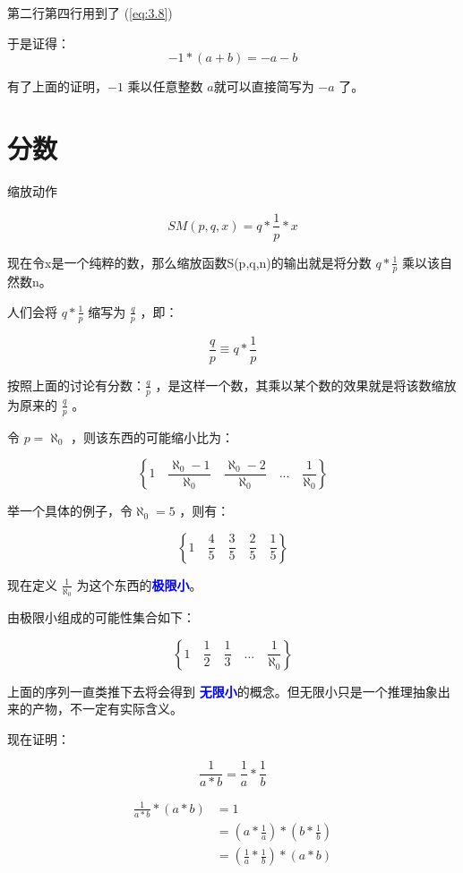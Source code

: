 \documentclass[12pt,oneside]{book}
\renewcommand{\emph}[1]{\textcolor{blue}{\textbf{#1}}}
\begin{document}
第二行第四行用到了 (\ref{eq:3.8})

于是证得：
\begin{equation}
\label{eq:4.10}
-1 * (a+b) = -a -b
\end{equation}

有了上面的证明，$-1$ 乘以任意整数 $a$就可以直接简写为 $-a$ 了。




\section{分数}
缩放动作

\begin{equation}
SM(p,q,x) = q* \frac{1}{p} *x
\end{equation}

现在令x是一个纯粹的数，那么缩放函数S(p,q,n)的输出就是将分数 $q* \frac{1}{p}$ 乘以该自然数n。

人们会将 $q* \frac{1}{p}$ 缩写为 $\frac{q}{p}$ ，即：

\begin{equation}
\frac{q}{p} \equiv q* \frac{1}{p}
\end{equation}

按照上面的讨论有分数：$\frac{q}{p}$ ，是这样一个数，其乘以某个数的效果就是将该数缩放为原来的 $\frac{q}{p}$ 。


令 $p=\aleph_0$ ，则该东西的可能缩小比为：

\[
\left\{1 \quad \frac{\aleph_0-1}{\aleph_0} \quad \frac{\aleph_0-2}{\aleph_0} \quad  ...  \quad \frac{1}{\aleph_0} \right\}
\]

举一个具体的例子，令$\aleph_0 = 5$ ，则有：

\[
\left\{1 \quad \frac{4}{5} \quad \frac{3}{5} \quad  \frac{2}{5}  \quad \frac{1}{5} \right\}
\]

现在定义 $\frac{1}{\aleph_0}$ 为这个东西的\emph{极限小}。

由极限小组成的可能性集合如下：

\[
\left\{1 \quad \frac{1}{2} \quad \frac{1}{3} \quad  ...  \quad \frac{1}{\aleph_0} \right\}
\]


上面的序列一直类推下去将会得到 \emph{无限小}的概念。但无限小只是一个推理抽象出来的产物，不一定有实际含义。

现在证明：

\begin{equation}
\label{eq:17}
\frac{1}{a*b} = \frac{1}{a} * \frac{1}{b}
\end{equation}

\begin{align*}
\frac{1}{a*b} * (a*b) &=1\\
&= (a*\frac{1}{a}) * (b * \frac{1}{b})\\
&=(\frac{1}{a} * \frac{1}{b}) * (a*b)
\end{align*}
\end{document}
